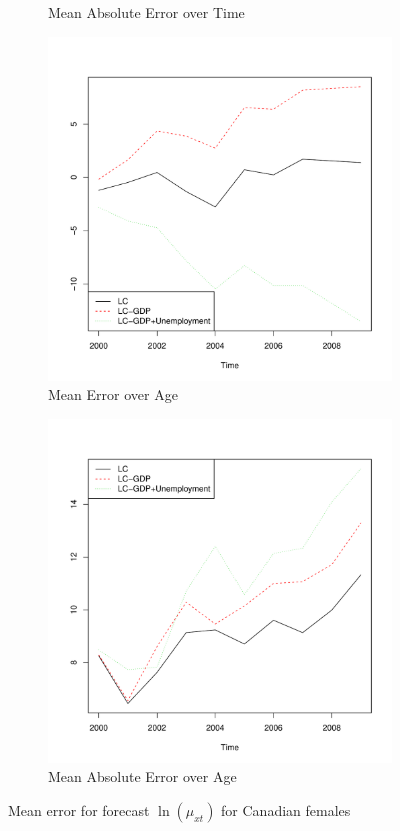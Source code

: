 \documentclass[AER, draftmode]{AEA}
\begin{document}
\begin{figure}[!htp]
\begin{subfigure}{0.4\textwidth}
		\caption{Mean Absolute Error over Time}
	\end{subfigure}
	\begin{subfigure}{0.4\textwidth}
		\includegraphics[width=\linewidth]{CAN_pred_error_time_female} 
		\caption{Mean Error over Age}
	\end{subfigure}
	\begin{subfigure}{0.4\textwidth}
		\includegraphics[width=\linewidth]{CAN_abs_pred_error_time_female} 
		\caption{Mean Absolute Error over Age}
	\end{subfigure}
	\caption{Mean error for forecast $\ln(\mu_{xt})$ for Canadian females}
\end{figure}
\end{document}
